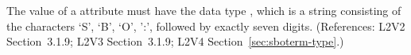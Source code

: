 The value of a  attribute must have the data type
, which is a string consisting of the characters `S', `B',
`O', ':', followed by exactly seven digits.  (References: L2V2 
Section~3.1.9; L2V3 Section~3.1.9; L2V4 Section~\ref{sec:sboterm-type}.)
